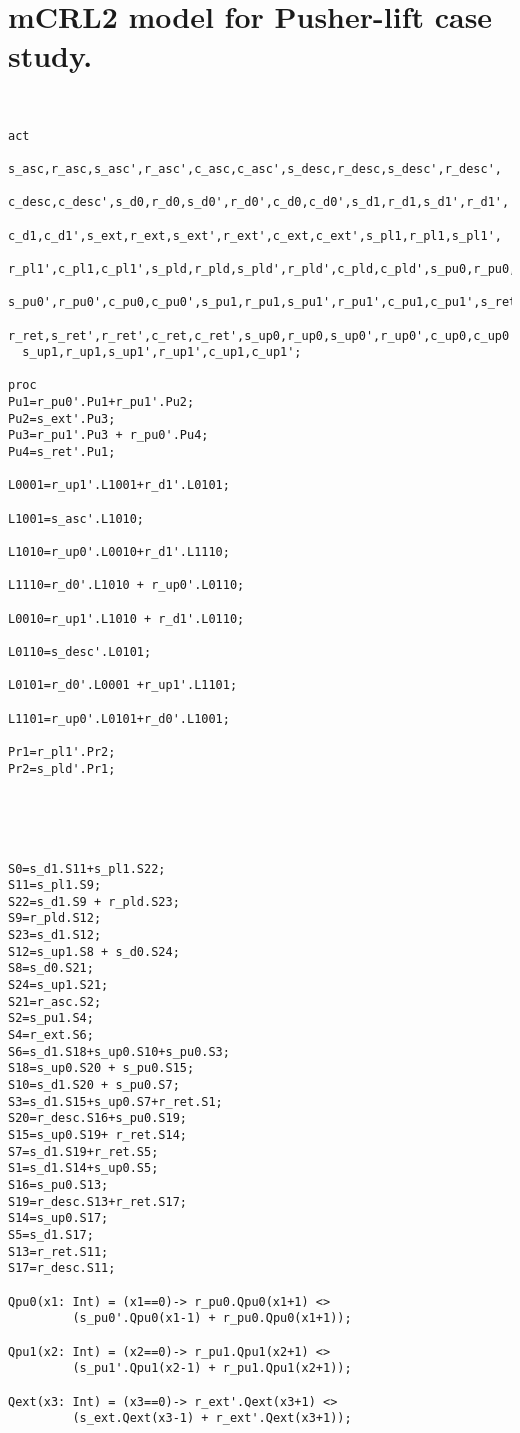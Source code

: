 \documentclass[a4paper,english,final]{article}
\theoremstyle{plain}
\theoremstyle{definition}
\begin{document}
\section{mCRL2 model for Pusher-lift case study.}\label{appendix-pl}
\begin{verbatim}


act
  s_asc,r_asc,s_asc',r_asc',c_asc,c_asc',s_desc,r_desc,s_desc',r_desc',
  c_desc,c_desc',s_d0,r_d0,s_d0',r_d0',c_d0,c_d0',s_d1,r_d1,s_d1',r_d1',
  c_d1,c_d1',s_ext,r_ext,s_ext',r_ext',c_ext,c_ext',s_pl1,r_pl1,s_pl1',
  r_pl1',c_pl1,c_pl1',s_pld,r_pld,s_pld',r_pld',c_pld,c_pld',s_pu0,r_pu0,
  s_pu0',r_pu0',c_pu0,c_pu0',s_pu1,r_pu1,s_pu1',r_pu1',c_pu1,c_pu1',s_ret,
  r_ret,s_ret',r_ret',c_ret,c_ret',s_up0,r_up0,s_up0',r_up0',c_up0,c_up0',
  s_up1,r_up1,s_up1',r_up1',c_up1,c_up1';

proc
Pu1=r_pu0'.Pu1+r_pu1'.Pu2;
Pu2=s_ext'.Pu3;
Pu3=r_pu1'.Pu3 + r_pu0'.Pu4;
Pu4=s_ret'.Pu1;

L0001=r_up1'.L1001+r_d1'.L0101;

L1001=s_asc'.L1010;

L1010=r_up0'.L0010+r_d1'.L1110;

L1110=r_d0'.L1010 + r_up0'.L0110;

L0010=r_up1'.L1010 + r_d1'.L0110;

L0110=s_desc'.L0101;

L0101=r_d0'.L0001 +r_up1'.L1101;

L1101=r_up0'.L0101+r_d0'.L1001;

Pr1=r_pl1'.Pr2;
Pr2=s_pld'.Pr1;





S0=s_d1.S11+s_pl1.S22;
S11=s_pl1.S9;
S22=s_d1.S9 + r_pld.S23;
S9=r_pld.S12;
S23=s_d1.S12;
S12=s_up1.S8 + s_d0.S24;
S8=s_d0.S21;
S24=s_up1.S21;
S21=r_asc.S2;
S2=s_pu1.S4;
S4=r_ext.S6;
S6=s_d1.S18+s_up0.S10+s_pu0.S3;
S18=s_up0.S20 + s_pu0.S15;
S10=s_d1.S20 + s_pu0.S7;
S3=s_d1.S15+s_up0.S7+r_ret.S1;
S20=r_desc.S16+s_pu0.S19;
S15=s_up0.S19+ r_ret.S14;
S7=s_d1.S19+r_ret.S5;
S1=s_d1.S14+s_up0.S5;
S16=s_pu0.S13;
S19=r_desc.S13+r_ret.S17;
S14=s_up0.S17;
S5=s_d1.S17;
S13=r_ret.S11;
S17=r_desc.S11;

Qpu0(x1: Int) = (x1==0)-> r_pu0.Qpu0(x1+1) <>
		 (s_pu0'.Qpu0(x1-1) + r_pu0.Qpu0(x1+1));

Qpu1(x2: Int) = (x2==0)-> r_pu1.Qpu1(x2+1) <>
		 (s_pu1'.Qpu1(x2-1) + r_pu1.Qpu1(x2+1));

Qext(x3: Int) = (x3==0)-> r_ext'.Qext(x3+1) <>
		 (s_ext.Qext(x3-1) + r_ext'.Qext(x3+1));


\end{verbatim}
\end{document}
